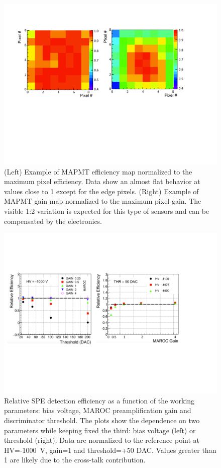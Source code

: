 \documentclass[final,5p,times,twocolumn]{elsarticle}
\begin{document}
\begin{figure}[t]
\begin{center}
\includegraphics[width=1.0\columnwidth]{EPS/Figure3.pdf}
\end{center}
\caption{(Left) Example of MAPMT efficiency map normalized to the maximum pixel efficiency.
Data show an almost flat behavior at values close to 1 except for the edge pixels.
(Right) Example of MAPMT gain map normalized to the maximum pixel gain. The visible 1:2
variation is expected for this type of sensors and can be compensated by the electronics.}
\label{Fig:EfMap}
\end{figure}

\begin{figure}[t]
\begin{center}
\includegraphics[width=1.0\columnwidth]{EPS/Figure4.pdf}
\end{center}
\caption{Relative SPE detection efficiency as a function of the working parameters: bias voltage,
MAROC preamplification gain and discriminator threshold. The plots show the dependence on two
parameters while keeping fixed the third: bias voltage (left) or threshold (right).
Data are normalized to the reference point at HV=-1000~V, gain=1 and threshold=+50 DAC. Values
greater than 1 are likely due to the cross-talk contribution.}
\label{Fig:EfScan}
\end{figure}
\end{document}
